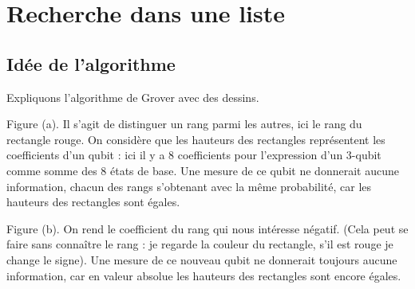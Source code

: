 \documentclass[11pt,class=report,crop=false]{standalone}
\begin{document}







\section{Recherche dans une liste}

\subsection{Idée de l'algorithme}

Expliquons l'algorithme de Grover avec des dessins. 


Figure (a). Il s'agit de distinguer un rang parmi les autres, ici le rang du rectangle rouge. On considère que les hauteurs des rectangles représentent les coefficients d'un qubit : ici il y a $8$ coefficients pour l'expression d'un $3$-qubit comme somme des $8$ états de base. Une mesure de ce qubit 
ne donnerait aucune information, chacun des rangs s'obtenant avec la même probabilité, car les hauteurs des rectangles sont égales.

\smallskip

Figure (b). On rend le coefficient du rang qui nous intéresse négatif. (Cela peut se faire sans connaître le rang : je regarde la couleur du rectangle, s'il est rouge je change le signe).
Une mesure de ce nouveau qubit ne donnerait toujours aucune information, car en valeur absolue les hauteurs des rectangles sont encore égales.
\end{document}
